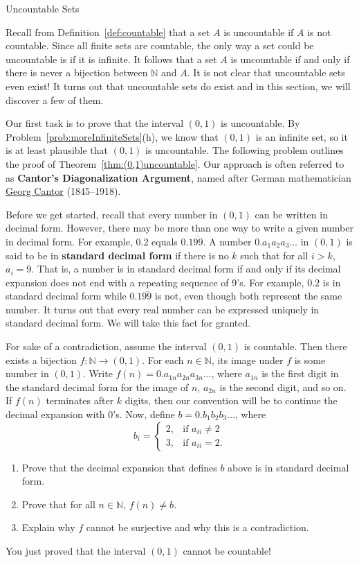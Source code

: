 \begin{section}{Uncountable Sets}

Recall from Definition~\ref{def:countable} that a set $A$ is uncountable if $A$ is not countable.  Since all finite sets are countable, the only way a set could be uncountable is if it is infinite.  It follows that a set $A$ is uncountable if and only if there is never a bijection between $\mathbb{N}$ and $A$.  It is not clear that uncountable sets even exist!  It turns out that uncountable sets do exist and in this section, we will discover a few of them.

Our first task is to prove that the interval $(0,1)$ is uncountable.  By Problem~\ref{prob:moreInfiniteSets}(h), we know that $(0,1)$ is an infinite set, so it is at least plausible that $(0,1)$ is uncountable.  The following problem outlines the proof of Theorem~\ref{thm:(0,1)uncountable}.  Our approach is often referred to as \textbf{Cantor's Diagonalization Argument}, named after German mathematician \href{https://en.wikipedia.org/wiki/Georg_Cantor}{Georg Cantor} (1845--1918).

Before we get started, recall that every number in $(0,1)$ can be written in decimal form. However, there may be more than one way to write a given number in decimal form.  For example, $0.2$ equals $0.1\overline{99}$.  A number $0.a_1a_2a_3\ldots$ in $(0,1)$ is said to be in \textbf{standard decimal form} if there is no $k$ such that for all $i>k$, $a_i=9$. That is, a number is in standard decimal form if and only if its decimal expansion does not end with a repeating sequence of 9's. For example, $0.2$ is in standard decimal form while $0.1\overline{99}$ is not, even though both represent the same number. It turns out that every real number can be expressed uniquely in standard decimal form. We will take this fact for granted.

\begin{problem}
For sake of a contradiction, assume the interval $(0,1)$ is countable.  Then there exists a bijection $f:\mathbb{N}\to (0,1)$. For each $n\in\mathbb{N}$, its image under $f$ is some number in $(0,1)$.  Write $f(n)=0.a_{1n}a_{2n}a_{3n}\ldots$, where $a_{1n}$ is the first digit in the standard decimal form for the image of $n$, $a_{2n}$ is the second digit, and so on. If $f(n)$ terminates after $k$ digits, then our convention will be to continue the decimal expansion with 0's. Now, define $b=0.b_1b_2b_3\ldots$, where
\[
b_i=\begin{cases}
2, & \text{if }a_{ii}\neq 2\\
3, & \text{if }a_{ii}=2.
\end{cases}
\]
\begin{enumerate}[label=\textrm{(\alph*)}]
\item Prove that the decimal expansion that defines $b$ above is in standard decimal form.
\item Prove that for all $n\in\mathbb{N}$, $f(n)\neq b$.
\item Explain why $f$ cannot be surjective and why this is a contradiction.
\end{enumerate}
You just proved that the interval $(0,1)$ cannot be countable!
\end{problem}


\end{section}
